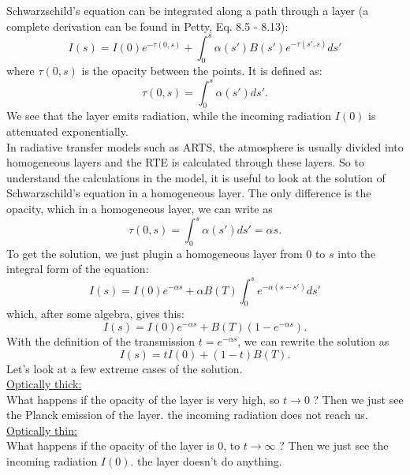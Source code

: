 \documentclass[a4paper,fleqn]{article}
\begin{document}
Schwarzschild's equation can be integrated along a path through a layer
(a complete derivation can be found in Petty, Eq. 8.5 - 8.13):
\begin{equation}
	I(s) = I(0) e^{-\tau (0,s)} + \int_{0}^{s} \alpha (s') B(s') 
	e^{-\tau (s',s)} ds' 
\end{equation}
where $\tau(0,s)$ is the opacity between the points. It is defined as:
\begin{equation}
	\tau (0,s) = \int_{0}^{s} \alpha(s') ds'.
\end{equation}
We see that the layer emits radiation, while the incoming radiation $I(0)$ is 
attenuated exponentially. \\
In radiative transfer models such as ARTS, the atmosphere is usually divided 
into homogeneous layers and the RTE is calculated through these layers. So to understand
the calculations in the model, it is useful to look at the solution of Schwarzschild's
equation in a homogeneous layer. The only difference is the opacity, which in a homogeneous
layer, we can write as
\begin{equation}
	\tau(0,s) = \int_{0}^{s} \alpha(s') ds' = \alpha s.
\end{equation}
To get the solution, we just plugin a homogeneous layer from 0 to $s$ into the integral 
form of the equation:
\begin{equation}
	I(s) = I(0) e^{-\alpha s} + \alpha B(T)\int_{0}^{s} e^{-\alpha (s-s')} ds' 
\end{equation}
which, after some algebra, gives this:
\begin{equation}
	I(s) = I(0) e^{-\alpha s} + B(T) \left( 1-e^{-\alpha s} \right).
\end{equation}
With the definition of the transmission $t = e^{-\alpha s}$, we can rewrite the solution as
\begin{equation}
	I(s) = t I(0)  + \left( 1-t \right) B(T).
\end{equation}
Let's look at a few extreme cases of the solution.\\
\underline{Optically thick:}\\
What happens if the opacity of the layer is very high, so $ t\rightarrow0$ ? 
Then we just see the Planck emission of the layer. the incoming radiation does not reach us.\\
\underline{Optically thin:}\\
What happens if the opacity of the layer is 0, to $ t \rightarrow \infty$ ? Then we just see
the incoming radiation $I(0)$. the layer doesn't do anything.\\
\end{document}
